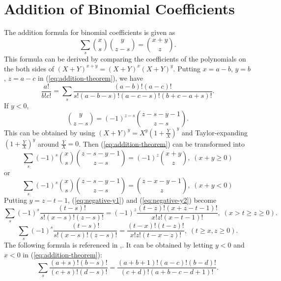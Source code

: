 \documentclass{article}
\begin{document}
\section{Addition of Binomial Coefficients}
\label{sec-7}
The addition formula for binomial coefficients is given as
\begin{equation}
\label{eq:addition-theorem}
\sum_{s} \binom{x}{s} \binom{y}{z-s} = \binom{x+y}{z}.
\end{equation}
This formula can be derived by comparing the coefficients of the polynomials on the both sides of $(X+Y)^{x+y}=(X+Y)^{x}(X+Y)^{y}$.
Putting $x = a-b$, $y=b$, $z=a-c$ in (\ref{eq:addition-theorem}), we have
\begin{equation}
\label{fml:triple-formula}
\frac{a!}{b!c!}= \sum_{s} \frac{(a-b)!(a-c)!}{s!(a-b-s)!(a-c-s)!(b+c-a+s)!}.
\end{equation}
If $y < 0$, 
\begin{equation}
\label{sub:negative-y}
\binom{y}{z-s} = (-1)^{z-s} \binom{z-s-y-1}{z-s}.
\end{equation}
This can be obtained by using $(X+Y)^{y}=X^{y}(1+\frac{Y}{X})^{y}$ and Taylor-expanding $(1+\frac{Y}{X})^{y}$ around $\frac{Y}{X}=0$.
Then (\ref{eq:addition-theorem}) can be transformed into
\begin{equation}
\label{eq:negative-y1}
\sum_{s}(-1)^{s} \binom{x}{s} \binom{z-s-y-1}{z-s} = (-1)^{z}\binom{x+y}{z}, \; (x+y \ge 0)
\end{equation}
or
\begin{equation}
\label{eq:negative-y2}
\sum_{s}(-1)^{s} \binom{x}{s} \binom{z-s-y-1}{z-s} = \binom{z-x-y-1}{z}, \;(x+y < 0)
\end{equation}
Putting $y=z-t-1$, (\ref{eq:negative-y1}) and (\ref{eq:negative-y2}) become
\begin{equation}
\label{ }
\sum_{s} (-1)^{s}\frac{(t-s)!}{s!(x-s)!(z-s)!}= (-1)^z \frac{(t-z)!(x+z-t-1)!}{x!z!(x-t-1)!}, \;( x > t \ge z \ge 0).
\end{equation}
\begin{equation}
\label{}
\sum_{s} (-1)^{s}\frac{(t-s)!}{s!(x-s)!(z-s)!}= \frac{(t-x)!(t-z)!}{x!z!(t-x-z)!}, \; (t \ge x,z \ge 0).
\end{equation}
The following formula is referenced in \cite{Messiah},\cite{Racah}. It can be obtained by letting $y <0$ and $x<0$ in (\ref{eq:addition-theorem}):
\begin{equation}
\label{eq:general_binomial_coeff}
\sum_{s} \frac{(a+s)!(b-s)!}{(c+s)!(d-s)!} = \frac{(a+b+1)!(a-c)!(b-d)!}{(c+d)!(a+b-c-d+1)!}.
\end{equation}
\end{document}
